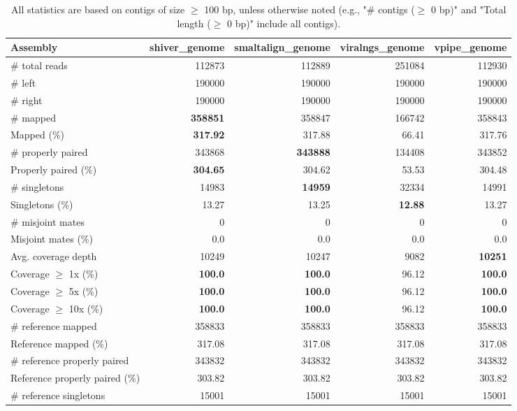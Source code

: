 \documentclass[12pt,a4paper]{article}
\begin{document}
\begin{table}[ht]
\begin{center}
\caption{All statistics are based on contigs of size $\geq$ 100 bp, unless otherwise noted (e.g., "\# contigs ($\geq$ 0 bp)" and "Total length ($\geq$ 0 bp)" include all contigs).}
\begin{tabular}{|l*{4}{|r}|}
\hline
Assembly & shiver\_genome & smaltalign\_genome & viralngs\_genome & vpipe\_genome \\ \hline
\# total reads & 112873 & 112889 & 251084 & 112930 \\ \hline
\# left & 190000 & 190000 & 190000 & 190000 \\ \hline
\# right & 190000 & 190000 & 190000 & 190000 \\ \hline
\# mapped & {\bf 358851} & 358847 & 166742 & 358843 \\ \hline
Mapped (\%) & {\bf 317.92} & 317.88 & 66.41 & 317.76 \\ \hline
\# properly paired & 343868 & {\bf 343888} & 134408 & 343852 \\ \hline
Properly paired (\%) & {\bf 304.65} & 304.62 & 53.53 & 304.48 \\ \hline
\# singletons & 14983 & {\bf 14959} & 32334 & 14991 \\ \hline
Singletons (\%) & 13.27 & 13.25 & {\bf 12.88} & 13.27 \\ \hline
\# misjoint mates & 0 & 0 & 0 & 0 \\ \hline
Misjoint mates (\%) & 0.0 & 0.0 & 0.0 & 0.0 \\ \hline
Avg. coverage depth & 10249 & 10247 & 9082 & {\bf 10251} \\ \hline
Coverage $\geq$ 1x (\%) & {\bf 100.0} & {\bf 100.0} & 96.12 & {\bf 100.0} \\ \hline
Coverage $\geq$ 5x (\%) & {\bf 100.0} & {\bf 100.0} & 96.12 & {\bf 100.0} \\ \hline
Coverage $\geq$ 10x (\%) & {\bf 100.0} & {\bf 100.0} & 96.12 & {\bf 100.0} \\ \hline
\# reference mapped & 358833 & 358833 & 358833 & 358833 \\ \hline
Reference mapped (\%) & 317.08 & 317.08 & 317.08 & 317.08 \\ \hline
\# reference properly paired & 343832 & 343832 & 343832 & 343832 \\ \hline
Reference properly paired (\%) & 303.82 & 303.82 & 303.82 & 303.82 \\ \hline
\# reference singletons & 15001 & 15001 & 15001 & 15001 \\ \hline

\end{tabular}
\end{center}
\end{table}
\end{document}
